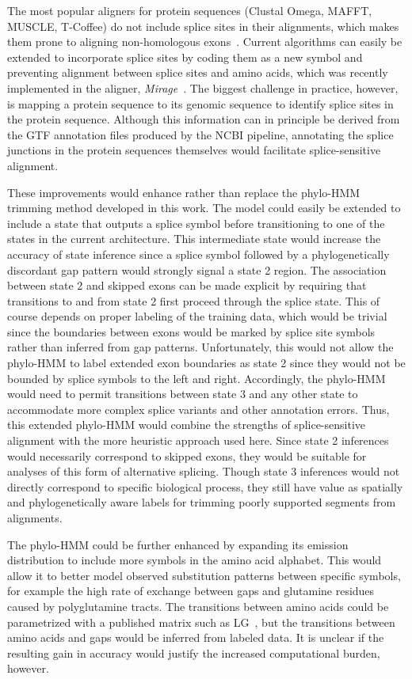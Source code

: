 The most popular aligners for protein sequences (Clustal Omega, MAFFT, MUSCLE, T-Coffee) do not include splice sites in their alignments, which makes them prone to aligning non-homologous exons~\cite{Sievers2017, Katoh2013, Edgar2004, Notredame2000}. Current algorithms can easily be extended to incorporate splice sites by coding them as a new symbol and preventing alignment between splice sites and amino acids, which was recently implemented in the aligner, \textit{Mirage}~\cite{Nord2018}. The biggest challenge in practice, however, is mapping a protein sequence to its genomic sequence to identify splice sites in the protein sequence. Although this information can in principle be derived from the GTF annotation files produced by the NCBI pipeline, annotating the splice junctions in the protein sequences themselves would facilitate splice-sensitive alignment.

These improvements would enhance rather than replace the phylo-HMM trimming method developed in this work. The model could easily be extended to include a state that outputs a splice symbol before transitioning to one of the states in the current architecture. This intermediate state would increase the accuracy of state inference since a splice symbol followed by a phylogenetically discordant gap pattern would strongly signal a state 2 region. The association between state 2 and skipped exons can be made explicit by requiring that transitions to and from state 2 first proceed through the splice state. This of course depends on proper labeling of the training data, which would be trivial since the boundaries between exons would be marked by splice site symbols rather than inferred from gap patterns. Unfortunately, this would not allow the phylo-HMM to label extended exon boundaries as state 2 since they would not be bounded by splice symbols to the left and right. Accordingly, the phylo-HMM would need to permit transitions between state 3 and any other state to accommodate more complex splice variants and other annotation errors. Thus, this extended phylo-HMM would combine the strengths of splice-sensitive alignment with the more heuristic approach used here. Since state 2 inferences would necessarily correspond to skipped exons, they would be suitable for analyses of this form of alternative splicing. Though state 3 inferences would not directly correspond to specific biological process, they still have value as spatially and phylogenetically aware labels for trimming poorly supported segments from alignments.

The phylo-HMM could be further enhanced by expanding its emission distribution to include more symbols in the amino acid alphabet. This would allow it to better model observed substitution patterns between specific symbols, for example the high rate of exchange between gaps and glutamine residues caused by polyglutamine tracts. The transitions between amino acids could be parametrized with a published matrix such as LG~\cite{Le2008}, but the transitions between amino acids and gaps would be inferred from labeled data. It is unclear if the resulting gain in accuracy would justify the increased computational burden, however.

